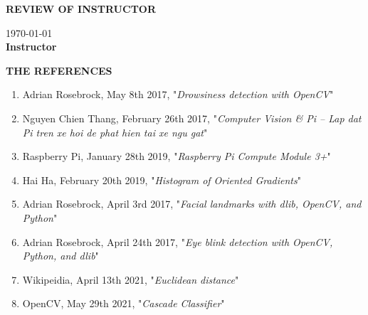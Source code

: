 \documentclass[a4paper,13pt]{report}
\begin{document}
    \newpage
    \centerline{\huge{\textbf{REVIEW OF INSTRUCTOR}}}
    \vspace{10mm}
    \noindent\makebox[\linewidth]{\rule{\paperwidth}{0.4pt}}
    \noindent\makebox[\linewidth]{\rule{\paperwidth}{0.4pt}}
    \noindent\makebox[\linewidth]{\rule{\paperwidth}{0.4pt}}
    \noindent\makebox[\linewidth]{\rule{\paperwidth}{0.4pt}}
    \noindent\makebox[\linewidth]{\rule{\paperwidth}{0.4pt}}
    \noindent\makebox[\linewidth]{\rule{\paperwidth}{0.4pt}}
    \noindent\makebox[\linewidth]{\rule{\paperwidth}{0.4pt}}
    \noindent\makebox[\linewidth]{\rule{\paperwidth}{0.4pt}}
    \noindent\makebox[\linewidth]{\rule{\paperwidth}{0.4pt}}
    \noindent\makebox[\linewidth]{\rule{\paperwidth}{0.4pt}}
    \noindent\makebox[\linewidth]{\rule{\paperwidth}{0.4pt}}
    \noindent\makebox[\linewidth]{\rule{\paperwidth}{0.4pt}}
    \noindent\makebox[\linewidth]{\rule{\paperwidth}{0.4pt}}
    \noindent\makebox[\linewidth]{\rule{\paperwidth}{0.4pt}}
    \noindent\makebox[\linewidth]{\rule{\paperwidth}{0.4pt}}
    \vspace{10mm}
    \begin{flushright}
        \today \\ 
        \vspace{5mm}
        \textbf{Instructor}
    \end{flushright}

    \newpage
    \tableofcontents
    \listoffigures

    

    

    

    

    

    

    \newpage
    \thispagestyle{plain}
    \begin{center}
        \Huge{\textbf{THE REFERENCES}}
    \end{center}
    \vspace{3mm}
    \begin{enumerate}
        \item Adrian Rosebrock, May 8th 2017, "\textit{Drowsiness detection with OpenCV}"
        \item Nguyen Chien Thang, February 26th 2017, "\textit{Computer Vision \& Pi – Lap dat Pi tren xe hoi de phat hien tai xe ngu gat}"
        \item Raspberry Pi, January 28th 2019, "\textit{Raspberry Pi Compute Module 3+}"
        \item Hai Ha, February 20th 2019, "\textit{Histogram of Oriented Gradients}"
        \item Adrian Rosebrock, April 3rd 2017, "\textit{Facial landmarks with dlib, OpenCV, and Python}"
        \item Adrian Rosebrock, April 24th 2017, "\textit{Eye blink detection with OpenCV, Python, and dlib}"
        \item Wikipeidia, April 13th 2021, "\textit{Euclidean distance}"
        \item OpenCV, May 29th 2021, "\textit{Cascade Classifier}"
    \end{enumerate}
\end{document}
